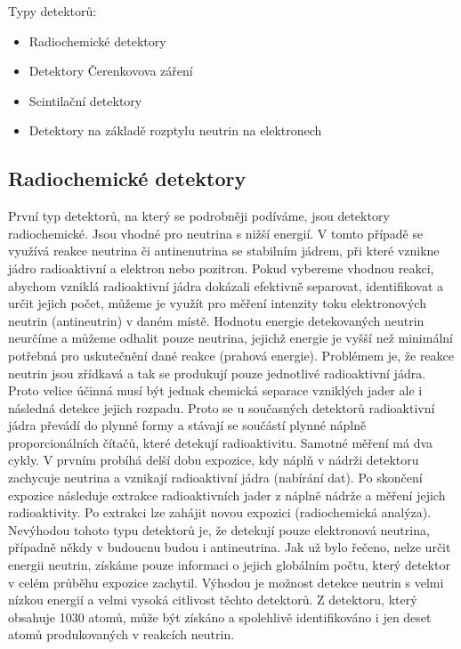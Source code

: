 \documentclass[../../main.tex]{subfiles}
\begin{document}
Typy detektorů:
\begin{itemize}
	\item Radiochemické detektory
	\item Detektory Čerenkovova záření
	\item Scintilační detektory
	\item Detektory na základě rozptylu neutrin na elektronech
\end{itemize}

\subsection{Radiochemické detektory}

První typ detektorů, na který se podrobněji podíváme, jsou detektory radiochemické. Jsou vhodné pro neutrina s nižší energií. V tomto případě se využívá reakce neutrina či antinenutrina se stabilním jádrem, při které vznikne jádro radioaktivní a elektron nebo pozitron. Pokud vybereme vhodnou reakci, abychom vzniklá radioaktivní jádra dokázali efektivně separovat, identifikovat a určit jejich počet, můžeme je využít pro měření intenzity toku elektronových neutrin (antineutrin) v daném místě. Hodnotu energie detekovaných neutrin neurčíme a můžeme odhalit pouze neutrina, jejichž energie je vyšší než minimální potřebná pro uskutečnění dané reakce (prahová energie). Problémem je, že reakce neutrin jsou zřídkavá a tak se produkují pouze jednotlivé radioaktivní jádra. Proto velice účinná musí být jednak chemická separace vzniklých jader ale i následná detekce jejich rozpadu. Proto se u současných detektorů radioaktivní jádra převádí do plynné formy a stávají se součástí plynné náplně proporcionálních čítačů, které detekují radioaktivitu. Samotné měření má dva cykly. V prvním probíhá delší dobu expozice, kdy náplň v nádrži detektoru zachycuje neutrina a vznikají radioaktivní jádra (nabírání dat). Po skončení expozice následuje extrakce radioaktivních jader z náplně nádrže a měření jejich radioaktivity. Po extrakci lze zahájit novou expozici (radiochemická analýza). Nevýhodou tohoto typu detektorů je, že detekují pouze elektronová neutrina, případně někdy v budoucnu budou i antineutrina. Jak už bylo řečeno, nelze určit energii neutrin, získáme pouze informaci o jejich globálním počtu, který detektor v celém průběhu expozice zachytil. Výhodou je možnost detekce neutrin s velmi nízkou energií a velmi vysoká citlivost těchto detektorů. Z detektoru, který obsahuje 1030 atomů, může být získáno a spolehlivě identifikováno i jen deset atomů produkovaných v reakcích neutrin.
\end{document}
